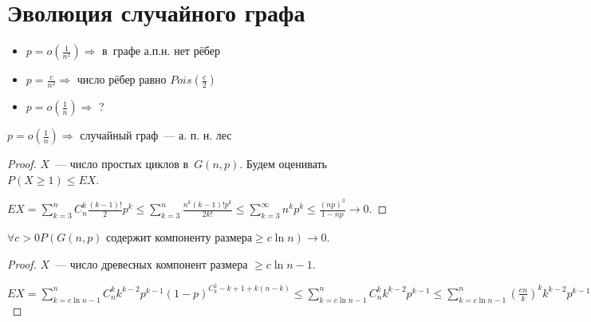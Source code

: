 \documentclass{article}
\begin{document}
\section{Эволюция случайного графа}

\begin{itemize}
	\item $p = o\left(\frac{1}{n^2}\right) \Rightarrow$ в~графе а.п.н. нет рёбер
	\item $p = \frac{c}{n^2} \Rightarrow $ число рёбер равно $Pois(\frac{c}{2})$
	\item $p = o\left(\frac{1}{n}\right) \Rightarrow $ ?
\end{itemize}

\begin{claim}
	$p = o\left(\frac{1}{n}\right) \Rightarrow $ случайный граф~--- а. п. н. лес
\end{claim}
\begin{proof}
	$X$~--- число простых циклов в~$G(n, p)$. Будем оценивать $P(X \ge 1) \le EX$.

	$EX = \sum\limits_{k=3}^n C_n^k \frac{(k-1)!}{2} p^k \le \sum\limits_{k=3}^n \frac{n^k (k-1)!
	p^k}{2k!} \le \sum\limits_{k=3}^\infty n^k p^k \le \frac{(np)^3}{1 - np} \rightarrow 0$.
\end{proof}

\begin{claim}
	$\forall c > 0 P(G(n,p) \text{ содержит компоненту размера} \ge c \ln n) \rightarrow 0$.
\end{claim}
\begin{proof}
	$X$~--- число древесных компонент размера $\ge c \ln n - 1$.

	$EX = \sum\limits_{k=c \ln n - 1}^n C_n^k k^{k-2} p^{k-1} (1-p)^{C_k^2 - k + 1 + k(n - k)} \le
	\sum\limits_{k = c \ln n - 1}^n C_n^k k^{k-2} p^{k-1} \le \sum\limits_{k = c\ln n - 1}^n
	\left(\frac{en}{k}\right)^k k^{k-2} p^{k-1} = en \sum (enp)^{k-1} \frac{1}{k^2} \le en (enp)^{c\ln
	n} \sum\limits_{c = 1}^\infty \frac{1}{k^2} < \frac{A}{p} (enp)^{c\ln n} = A
	(e^\frac{1}{c}np)^{c\ln n} \rightarrow 0$
\end{proof}
\end{document}
